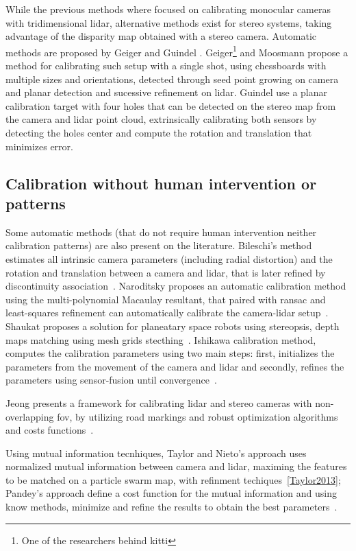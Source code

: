 While the previous methods where focused on calibrating monocular cameras with tridimensional \ac{lidar}, alternative methods exist for stereo systems, taking advantage of the disparity map obtained with a stereo camera. Automatic methods are proposed by Geiger \etal and Guindel \etal. Geiger\footnote{One of the researchers behind \ac{kitti}} and Moosmann propose a method for calibrating such setup with a single shot, using chessboards with multiple sizes and orientations, detected through seed point growing on camera and planar detection and sucessive refinement on \ac{lidar}\cite{Geiger2012a}. Guindel \etal use a planar calibration target with four holes that can be detected on the stereo map from the camera and \ac{lidar} point cloud, extrinsically calibrating both sensors by detecting the holes center and compute the rotation and translation that minimizes error. 

\subsection{Calibration without human intervention or patterns}
Some automatic methods (that do not require human intervention neither calibration patterns) are also present on the literature. Bileschi's method estimates all intrinsic camera parameters  (including radial distortion) and the rotation and translation between a camera and \ac{lidar}, that is later refined by discontinuity association~\cite{Bileschi2009}. Naroditsky \etal proposes an automatic calibration method using the multi-polynomial Macaulay resultant, that paired with \ac{ransac} and least-squares refinement can automatically calibrate the camera-\ac{lidar} setup~\cite{Naroditsky2011}. Shaukat proposes a solution for planeatary space robots using stereopsis, depth maps matching using mesh grids stecthing~\cite{Shaukat2016}. Ishikawa \etal calibration method, computes the calibration parameters using two main steps: first, initializes the parameters from the movement of the camera and \ac{lidar} and secondly, refines the parameters using sensor-fusion until convergence~\cite{Ishikawa2018}. 

Jeong \etal presents a framework for calibrating \ac{lidar} and stereo cameras with non-overlapping \ac{fov}, by utilizing road markings and robust optimization algorithms and costs functions~\cite{Jeong2019}.

Using mutual information tecnhiques, Taylor and Nieto's approach uses normalized mutual information between camera and \ac{lidar}, maximing the features to be matched on a particle swarm map, with refinment techiques~\ref{Taylor2013}; Pandey's \etal approach define a cost function for the mutual information and using know methods, minimize and refine the results to obtain the best parameters~\cite{Pandey2012}.


